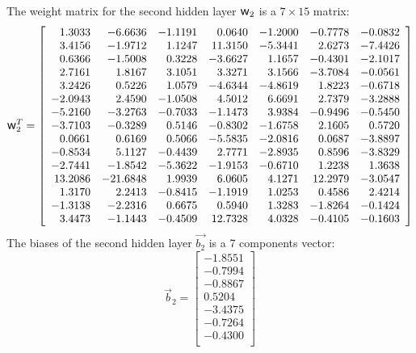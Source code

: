 \documentclass[algorithms,article,submit,pdftex,moreauthors]{Definitions/mdpi}
\DeclareRobustCommand{\w}{\mbox{\large\ensuremath{\mathsf{w}}}}
\begin{document}
The weight matrix for the second hidden layer $\w_2$ is a $7\times15$ matrix:
\begin{equation*}
\w_2^T = \left[
\begin{array}{rrrrrrr}
1.3033 & -6.6636 & -1.1191 & 0.0640 & -1.2000 & -0.7778 & -0.0832\\ 
3.4156 & -1.9712 & 1.1247 & 11.3150 & -5.3441 & 2.6273 & -7.4426\\ 
0.6366 & -1.5008 & 0.3228 & -3.6627 & 1.1657 & -0.4301 & -2.1017\\ 
2.7161 & 1.8167 & 3.1051 & 3.3271 & 3.1566 & -3.7084 & -0.0561\\ 
3.2426 & 0.5226 & 1.0579 & -4.6344 & -4.8619 & 1.8223 & -0.6718\\ 
-2.0943 & 2.4590 & -1.0508 & 4.5012 & 6.6691 & 2.7379 & -3.2888\\ 
-5.2160 & -3.2763 & -0.7033 & -1.1473 & 3.9384 & -0.9496 & -0.5450\\ 
-3.7103 & -0.3289 & 0.5146 & -0.8302 & -1.6758 & 2.1605 & 0.5720\\ 
0.0661 & 0.6169 & 0.5066 & -5.5835 & -2.0816 & 0.0687 & -3.8897\\ 
-0.8534 & 5.1127 & -0.4439 & 2.7771 & -2.8935 & 0.8596 & -3.8329\\ 
-2.7441 & -1.8542 & -5.3622 & -1.9153 & -0.6710 & 1.2238 & 1.3638\\ 
13.2086 & -21.6848 & 1.9939 & 6.0605 & 4.1271 & 12.2979 & -3.0547\\ 
1.3170 & 2.2413 & -0.8415 & -1.1919 & 1.0253 & 0.4586 & 2.4214\\ 
-1.3138 & -2.2316 & 0.6675 & 0.5940 & 1.3283 & -1.8264 & -0.1424\\ 
3.4473 & -1.1443 & -0.4509 & 12.7328 & 4.0328 & -0.4105 & -0.1603\\ 
\end{array}\right]
\end{equation*}
The biases of the second hidden layer $\overrightarrow{b_2}$ is a 7 components vector:
\begin{equation*}
\overrightarrow{b}_2 = \left[
\begin{array}{r}
-1.8551\\ 
-0.7994\\ 
-0.8867\\ 
0.5204\\ 
-3.4375\\ 
-0.7264\\ 
-0.4300\\ 
\end{array}\right]
\end{equation*}
\end{document}
